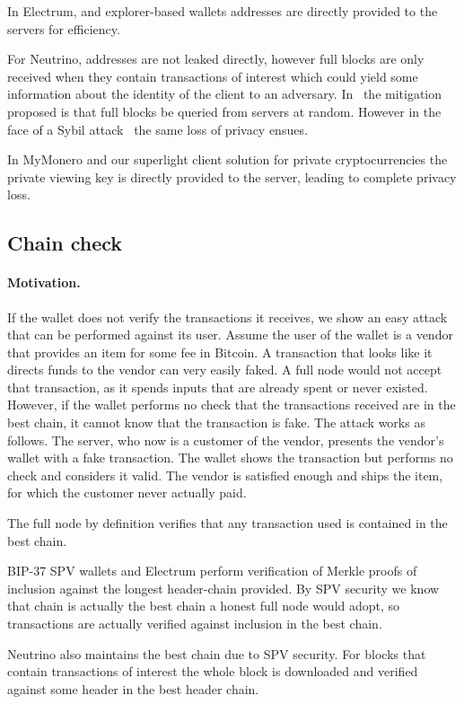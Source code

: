 In Electrum, and explorer-based wallets addresses are directly provided to the servers for efficiency.

For Neutrino, addresses are not leaked directly, however full blocks are only received when they contain transactions of interest which could yield some information about the identity of the client to an adversary. In~\cite{bip157} the mitigation proposed is that full blocks be queried from servers at random. However in the face of a Sybil attack~\cite{sybil} the same loss of privacy ensues.

In MyMonero and our superlight client solution for private cryptocurrencies the private viewing key is directly provided to the server, leading to complete privacy loss.

\subsection{Chain check}
\paragraph{Motivation.} If the wallet does not verify the transactions it receives, we show an easy attack that can be performed against its user. Assume the user of the wallet is a vendor that provides an item for some fee in Bitcoin. A transaction that looks like it directs funds to the vendor can very easily faked. A full node would not accept that transaction, as it spends inputs that are already spent or never existed. However, if the wallet performs no check that the transactions received are in the best chain, it cannot know that the transaction is fake. The attack works as follows. The server, who now is a customer of the vendor, presents the vendor's wallet with a fake transaction. The wallet shows the transaction but performs no check and considers it valid. The vendor is satisfied enough and ships the item, for which the customer never actually paid.

The full node by definition verifies that any transaction used is contained in the best chain.

BIP-37 SPV wallets and Electrum perform verification of Merkle proofs of inclusion against the longest header-chain provided. By SPV security we know that chain is actually the best chain a honest full node would adopt, so transactions are actually verified against inclusion in the best chain.

Neutrino also maintains the best chain due to SPV security. For blocks that contain transactions of interest the whole block is downloaded and verified against some header in the best header chain.

